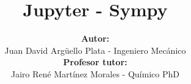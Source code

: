 \documentclass[20]{beamer}
\title[ACMA]{\textbf{Jupyter - Sympy}}
\author[Juan David]{
\textbf{Autor:}\\
Juan David Argüello Plata - Ingeniero Mecánico\\
\vspace{5pt}
\textbf{Profesor tutor:}\\
Jairo René Martínez Morales - Químico PhD
}
\institute[]{
	CENIVAM\\
	Universidad Industrial de Santander
}
\date{}
\begin{document}
\begin{frame}
\titlepage
\end{frame}








\end{document}
